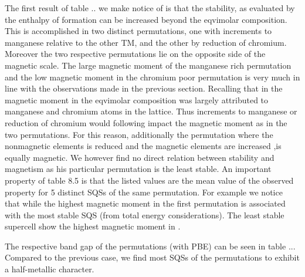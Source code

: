 The first result of table .. we make notice of is that the stability, as evaluated by the enthalpy of formation can be increased beyond the eqvimolar composition. This is accomplished in two distinct permutations, one with increments to  manganese relative to the other TM, and the other by reduction of chromium. Moreover the two respective permutations lie on the opposite side of the magnetic scale. The large magnetic moment of the manganese rich permutation and the low magnetic moment in the chromium poor permutation is very much in line with the observations made in the previous section. Recalling that in the magnetic moment in the eqvimolar composition was largely attributed to manganese and chromium atoms in the lattice. Thus increments to manganese or reduction of chromium would following impact the magnetic moment as in the two permutations. For this reason, additionally the permutation  where the nonmagnetic elements is reduced and the magnetic elements are increased ,is equally magnetic. We however find no direct relation between stability and magnetism as his particular permutation is the least stable. An important property of table 8.5 is that the listed values are the mean value of the observed property for 5 distinct SQSs of the same permutation. For example we notice that while the highest magnetic moment in the first permutation is associated with the most stable SQS (from total energy considerations). The least stable supercell show the highest magnetic moment in . 

The respective band gap of the permutations (with PBE) can be seen in table ... Compared to the previous case, we find most SQSs of the permutations to exhibit a half-metallic character. 

